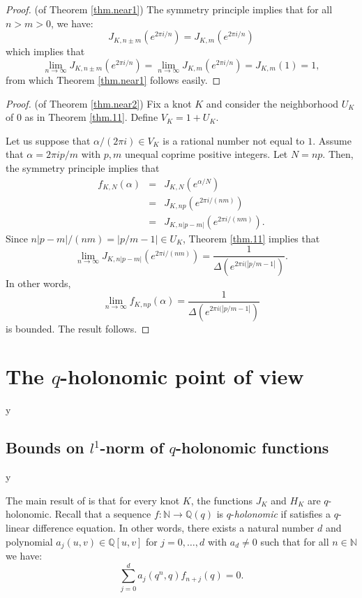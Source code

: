 \documentclass{amsart}
\theoremstyle{definition}
\def\printname#1{
    \if\draft y
        \smash{\makebox[0pt]{\hspace{-0.5in}
            \raisebox{8pt}{\tt\tiny #1}}}
    \fi
}
\def\lbl#1{\label{#1}\printname{#1}}
\def\BN{\mathbb N}
\def\BQ{\mathbb Q}
\def\D{\Delta}
\def\a{\alpha}
\def\longto{\longrightarrow}
\begin{document}
\begin{proof}(of Theorem \ref{thm.near1})
The symmetry principle implies that for all $n  >m >0$, we have:
$$
J_{K,n\pm m}(e^{2 \pi i/n})=J_{K,m}(e^{2 \pi i/n})
$$
which implies that
$$
\lim_{n\to\infty}J_{K,n\pm m}(e^{2 \pi i/n})=\lim_{n\to\infty}
J_{K,m}(e^{2 \pi i/n})=J_{K,m}(1)=1,
$$
from which Theorem \ref{thm.near1} follows easily.
\end{proof}




\begin{proof}(of Theorem \ref{thm.near2})
Fix a knot $K$ and consider the neighborhood $U_K$ of $0$ as in
Theorem \ref{thm.11}. Define $V_K=1+U_K$.

Let us suppose that $\a/(2 \pi i) \in V_K$ is a rational number not
equal to $1$. Assume that  $\a=2 \pi i p/m$ with $p,m$ unequal
coprime positive integers.  Let $N=np$. Then, the symmetry principle
implies that
\begin{eqnarray*}
f_{K,N}(\a) &=& J_{K,N}(e^{\a/N}) \\
&=& J_{K,np}(e^{2 \pi i/(nm)}) \\
&=& J_{K, n|p-m|}(e^{2 \pi i/(nm)}).
\end{eqnarray*}
Since $n|p-m|/(nm)=|p/m-1|\in U_K$, Theorem \ref{thm.11} implies
that
$$
\lim_{n\to\infty} J_{K, n|p-m|}(e^{2 \pi i/(nm)}) = \frac{1}{\D(e^{2
\pi i(|p/m-1|})}.
$$
In other words,
$$
\lim_{n\to\infty} f_{K,np}(\a)= \frac{1}{\D(e^{2 \pi i(|p/m-1|})}$$
is bounded. The result follows.
\end{proof}







\section{The $q$-holonomic point of view}
\lbl{sec.qholonomic}

\subsection{Bounds on $l^1$-norm  of $q$-holonomic functions}
\lbl{sub.qholo}


The main result of \cite{GL} is that for every knot $K$, the
functions $J_K$ and $H_K$ are $q$-holonomic. Recall that a sequence
$f:\BN\longto\BQ(q)$ is $q$-{\em holonomic} if satisfies a
$q$-{linear difference equation}. In other words, there exists a
natural number $d$ and polynomial $a_j(u,v) \in \BQ[u,v]$ for
$j=0,\dots,d$ with $a_d \neq 0$ such that for all $n \in \BN$ we
have:
\begin{equation}
\sum_{j=0}^d a_j(q^n,q) f_{n+j}(q)=0.
\label{e0001}
\end{equation}
\end{document}
